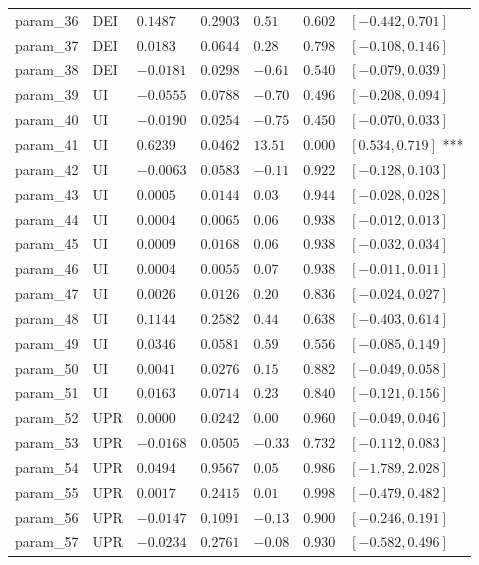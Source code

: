 \documentclass{article}
\begin{document}
\begin{longtable}{lllllll}
param\_36 & DEI & $0.1487$ & $0.2903$ & $0.51$ & $0.602$ & $[-0.442, 0.701]$  \\
param\_37 & DEI & $0.0183$ & $0.0644$ & $0.28$ & $0.798$ & $[-0.108, 0.146]$  \\
param\_38 & DEI & $-0.0181$ & $0.0298$ & $-0.61$ & $0.540$ & $[-0.079, 0.039]$  \\
param\_39 & UI & $-0.0555$ & $0.0788$ & $-0.70$ & $0.496$ & $[-0.208, 0.094]$  \\
param\_40 & UI & $-0.0190$ & $0.0254$ & $-0.75$ & $0.450$ & $[-0.070, 0.033]$  \\
param\_41 & UI & $0.6239$ & $0.0462$ & $13.51$ & $0.000$ & $[0.534, 0.719]$ *** \\
param\_42 & UI & $-0.0063$ & $0.0583$ & $-0.11$ & $0.922$ & $[-0.128, 0.103]$  \\
param\_43 & UI & $0.0005$ & $0.0144$ & $0.03$ & $0.944$ & $[-0.028, 0.028]$  \\
param\_44 & UI & $0.0004$ & $0.0065$ & $0.06$ & $0.938$ & $[-0.012, 0.013]$  \\
param\_45 & UI & $0.0009$ & $0.0168$ & $0.06$ & $0.938$ & $[-0.032, 0.034]$  \\
param\_46 & UI & $0.0004$ & $0.0055$ & $0.07$ & $0.938$ & $[-0.011, 0.011]$  \\
param\_47 & UI & $0.0026$ & $0.0126$ & $0.20$ & $0.836$ & $[-0.024, 0.027]$  \\
param\_48 & UI & $0.1144$ & $0.2582$ & $0.44$ & $0.638$ & $[-0.403, 0.614]$  \\
param\_49 & UI & $0.0346$ & $0.0581$ & $0.59$ & $0.556$ & $[-0.085, 0.149]$  \\
param\_50 & UI & $0.0041$ & $0.0276$ & $0.15$ & $0.882$ & $[-0.049, 0.058]$  \\
param\_51 & UI & $0.0163$ & $0.0714$ & $0.23$ & $0.840$ & $[-0.121, 0.156]$  \\
param\_52 & UPR & $0.0000$ & $0.0242$ & $0.00$ & $0.960$ & $[-0.049, 0.046]$  \\
param\_53 & UPR & $-0.0168$ & $0.0505$ & $-0.33$ & $0.732$ & $[-0.112, 0.083]$  \\
param\_54 & UPR & $0.0494$ & $0.9567$ & $0.05$ & $0.986$ & $[-1.789, 2.028]$  \\
param\_55 & UPR & $0.0017$ & $0.2415$ & $0.01$ & $0.998$ & $[-0.479, 0.482]$  \\
param\_56 & UPR & $-0.0147$ & $0.1091$ & $-0.13$ & $0.900$ & $[-0.246, 0.191]$  \\
param\_57 & UPR & $-0.0234$ & $0.2761$ & $-0.08$ & $0.930$ & $[-0.582, 0.496]$  \\

\end{longtable}
\end{document}
